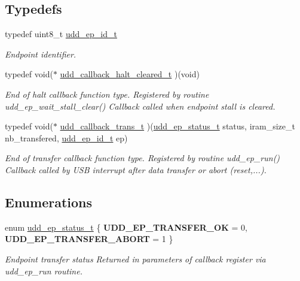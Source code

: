 \subsection*{Typedefs}
\begin{DoxyCompactItemize}
\item 
\hypertarget{group__udd__group_ga6f25ea016c07bd48c3074f51d8ef8b01}{typedef uint8\-\_\-t \hyperlink{group__udd__group_ga6f25ea016c07bd48c3074f51d8ef8b01}{udd\-\_\-ep\-\_\-id\-\_\-t}}\label{group__udd__group_ga6f25ea016c07bd48c3074f51d8ef8b01}

\begin{DoxyCompactList}\small\item\em Endpoint identifier. \end{DoxyCompactList}\item 
\hypertarget{group__udd__group_ga7ab8d43f0761ecfb4d48770ac4ebb661}{typedef void($\ast$ \hyperlink{group__udd__group_ga7ab8d43f0761ecfb4d48770ac4ebb661}{udd\-\_\-callback\-\_\-halt\-\_\-cleared\-\_\-t} )(void)}\label{group__udd__group_ga7ab8d43f0761ecfb4d48770ac4ebb661}

\begin{DoxyCompactList}\small\item\em End of halt callback function type. Registered by routine udd\-\_\-ep\-\_\-wait\-\_\-stall\-\_\-clear() Callback called when endpoint stall is cleared. \end{DoxyCompactList}\item 
typedef void($\ast$ \hyperlink{group__udd__group_ga01ae6265aac427f07f5b405c15b7c945}{udd\-\_\-callback\-\_\-trans\-\_\-t} )(\hyperlink{group__udd__group_gac0f77f5a0e085af1242b48fd1054959a}{udd\-\_\-ep\-\_\-status\-\_\-t} status, iram\-\_\-size\-\_\-t nb\-\_\-transfered, \hyperlink{group__udd__group_ga6f25ea016c07bd48c3074f51d8ef8b01}{udd\-\_\-ep\-\_\-id\-\_\-t} ep)
\begin{DoxyCompactList}\small\item\em End of transfer callback function type. Registered by routine udd\-\_\-ep\-\_\-run() Callback called by U\-S\-B interrupt after data transfer or abort (reset,...). \end{DoxyCompactList}\end{DoxyCompactItemize}
\subsection*{Enumerations}
\begin{DoxyCompactItemize}
\item 
enum \hyperlink{group__udd__group_gac0f77f5a0e085af1242b48fd1054959a}{udd\-\_\-ep\-\_\-status\-\_\-t} \{ {\bfseries U\-D\-D\-\_\-\-E\-P\-\_\-\-T\-R\-A\-N\-S\-F\-E\-R\-\_\-\-O\-K} =  0, 
{\bfseries U\-D\-D\-\_\-\-E\-P\-\_\-\-T\-R\-A\-N\-S\-F\-E\-R\-\_\-\-A\-B\-O\-R\-T} =  1
 \}
\begin{DoxyCompactList}\small\item\em Endpoint transfer status Returned in parameters of callback register via udd\-\_\-ep\-\_\-run routine. \end{DoxyCompactList}\end{DoxyCompactItemize}
